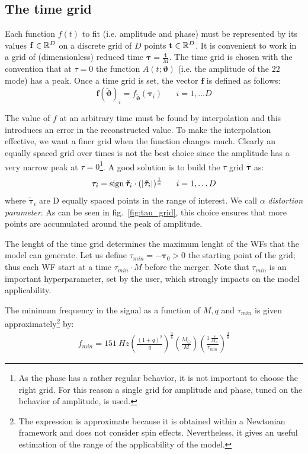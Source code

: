 \subsection{The time grid}
Each function $f(t)$ to fit (i.e. amplitude and phase) must be represented by its values $\mathbf{f} \in \mathbb{R}^D$ on a discrete grid of $D$ points $\mathbf{t} \in \mathbb{R}^D$.
It is convenient to work in a grid of (dimensionless) reduced time $\boldsymbol{\tau} = \frac{\mathbf{t}}{M}$.
The time grid is chosen with the convention that at $\tau=0$ the function $A(t;\boldsymbol{\vartheta})$ (i.e. the amplitude of the ${22}$ mode) has a peak.
Once a time grid is set, the vector $\mathbf{f}$ is defined as follows:
\begin{equation}
	\mathbf{f}({\tilde{\boldsymbol{\vartheta}}})_i = f_{{\tilde{\boldsymbol{\vartheta}}}}(\boldsymbol{\tau}_i) \;\;\;\;\;\; i = 1, \ldots D
\end{equation}
\par
The value of $f$ at an arbitrary time must be found by interpolation and this introduces an error in the reconstructed value.
To make the interpolation effective, we want a finer grid when the function changes much.
Clearly an equally spaced grid over times is not the best choice since the amplitude has a very narrow peak at $\tau=0$\footnote{As the phase has a rather regular behavior, it is not important to choose the right grid. For this reason a single grid for amplitude and phase, tuned on the behavior of amplitude, is used.}.
A good solution is to build the $\tau$ grid ${\boldsymbol{\tau}}$ as:
\begin{equation} \label{eq:tau_grid}
	{\boldsymbol{\tau}}_i = \operatorname{sign}{\boldsymbol{\tilde{\tau}}_i} \cdot (|\boldsymbol{\tilde{\tau}}_i|)^{\frac{1}{\alpha}} \;\;\;\;\;\; i = 1, \ldots D
\end{equation}
where $\boldsymbol{\tilde{\tau}}_i$ are D equally spaced points in the range of interest.
We call $\alpha$ \textit{distortion parameter}.
As can be seen in fig.~\ref{fig:tau_grid}, this choice ensures that more points are accumulated around the peak of amplitude.
\par
The lenght of the time grid determines the maximum lenght of the WFs that the model can generate.
Let us define $\tau_{min} = -{\boldsymbol{\tau}}_0 > 0 $ the starting point of the grid; thus each WF start at a time $\tau_{min}\cdot M$ before the merger.
Note that $\tau_{min}$ is an important hyperparameter, set by the user, which strongly impacts on the model applicability.
\par
The minimum frequency in the signal as a function of $M, q$ and $\tau_{min}$ is given approximately\footnote{The expression is approximate because it is obtained within a Newtonian framework and does not consider spin effects.
Nevertheless, it gives an useful estimation of the range of the applicability of the model.}
by:
\begin{align}\label{eq:f_min}
	f_{min} = \SI{151}{Hz}  \left( \frac{(1+q)^2}{q} \right)^{\frac{3}{8}}  \left( \frac{M_\odot}{M} \right)  \left(\frac{\SI{1}{ \frac{s}{M_\odot}}}{\tau_{min}} \right)^{\frac{3}{8}}  
\end{align} 



